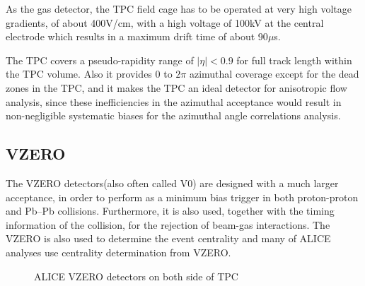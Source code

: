 As the gas detector, the TPC field cage has to be operated at very high voltage gradients, of about 400V/cm, with a high voltage of 100kV at the central electrode which results in a maximum drift time of about 90$\mu$s.

The TPC covers a pseudo-rapidity range of $|\eta| < 0.9$ for full track length within the TPC volume. Also it provides 0 to $2\pi$ azimuthal coverage except for the dead zones in the TPC, and it makes the TPC an ideal detector for anisotropic flow analysis, since these inefficiencies in the  azimuthal acceptance would result in non-negligible systematic biases for the azimuthal angle correlations analysis.



\subsection{VZERO}

The VZERO detectors(also often called V0) \cite{collaboration2013performance} are designed with a much larger acceptance, in order to perform as a minimum bias trigger in both proton-proton and Pb–Pb collisions. Furthermore, it is also used, together with the timing information of the collision, for the rejection of beam-gas interactions. The VZERO is also used to determine the event centrality and many of ALICE analyses use centrality determination from VZERO.

\begin{figure}[!h]
		\begin{center}
        	\caption{ALICE VZERO detectors on both side of TPC}
        	\label{its}
        \end{center}
    \end{figure}


